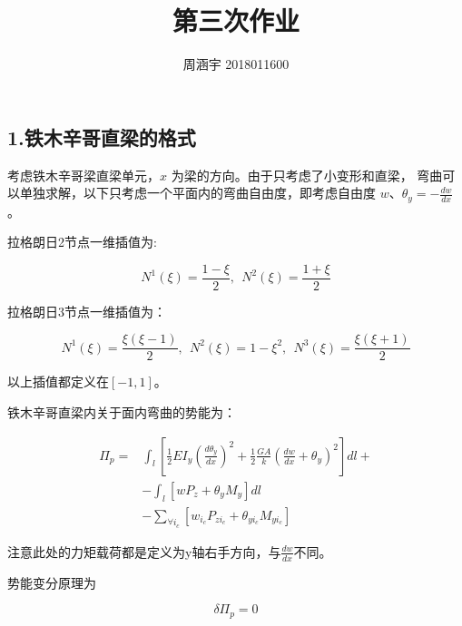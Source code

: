 \documentclass[UTF8,c5size]{ctexart}
\title{{\bfseries 第三次作业}}
\author{周涵宇 2018011600}
\date{}
\begin{document}
\maketitle

\subsection*{1.铁木辛哥直梁的格式}
考虑铁木辛哥梁直梁单元，$x$ 为梁的方向。由于只考虑了小变形和直梁，
弯曲可以单独求解，以下只考虑一个平面内的弯曲自由度，即考虑自由度
$w$、$\theta_y=-\frac{dw}{dx}$。


拉格朗日2节点一维插值为:

\begin{equation}
    N^1(\xi) = \frac{1-\xi}{2},\ \ N^2(\xi) = \frac{1+\xi}{2}
\end{equation}

拉格朗日3节点一维插值为：

\begin{equation}
    N^1(\xi) = \frac{\xi(\xi-1)}{2},\ \ 
    N^2(\xi) = 1-\xi^2,\ \ 
    N^3(\xi) = \frac{\xi(\xi+1)}{2}
\end{equation}


以上插值都定义在$[-1,1]$。

铁木辛哥直梁内关于面内弯曲的势能为：

\begin{equation}
    \begin{split}
        \Pi_p=
            &\int_{l}{\left[
            \frac{1}{2}EI_y\left(\frac{d\theta_y}{dx}\right)^2+  
            \frac{1}{2}\frac{GA}{k}\left(\frac{dw}{dx}+\theta_y\right)^2
            \right]dl}+\\
            &-\int_{l}{\left[
                wP_z+\theta_yM_y
                \right]dl}\\
            &-\sum_{\forall i_c}{\left[
            w_{i_c}P_{zi_c}
            +\theta_{yi_c}M_{yi_c}
            \right]}
    \end{split}
\end{equation}

注意此处的力矩载荷都是定义为y轴右手方向，与$\frac{dw}{dx}$不同。

势能变分原理为

$$
\delta\Pi_p=0
$$
\end{document}
